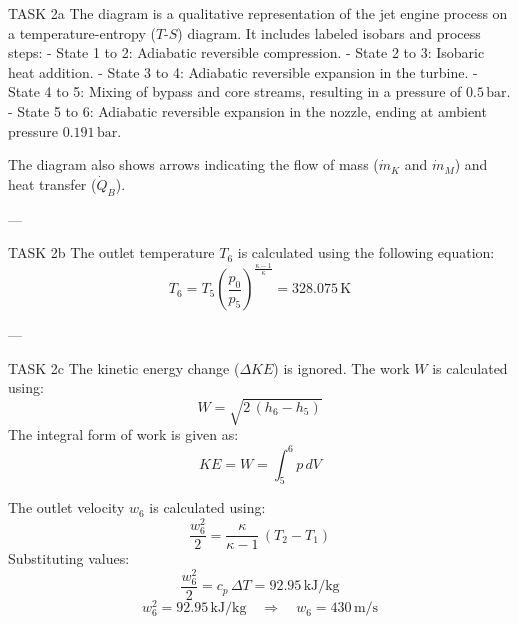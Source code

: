 TASK 2a  
The diagram is a qualitative representation of the jet engine process on a temperature-entropy (\( T \)-\( S \)) diagram. It includes labeled isobars and process steps:  
- State 1 to 2: Adiabatic reversible compression.  
- State 2 to 3: Isobaric heat addition.  
- State 3 to 4: Adiabatic reversible expansion in the turbine.  
- State 4 to 5: Mixing of bypass and core streams, resulting in a pressure of \( 0.5 \, \text{bar} \).  
- State 5 to 6: Adiabatic reversible expansion in the nozzle, ending at ambient pressure \( 0.191 \, \text{bar} \).  

The diagram also shows arrows indicating the flow of mass (\( \dot{m}_K \) and \( \dot{m}_M \)) and heat transfer (\( \dot{Q}_B \)).  

---

TASK 2b  
The outlet temperature \( T_6 \) is calculated using the following equation:  
\[
T_6 = T_5 \left( \frac{p_0}{p_5} \right)^{\frac{\kappa - 1}{\kappa}} = 328.075 \, \text{K}
\]  

---

TASK 2c  
The kinetic energy change (\( \Delta KE \)) is ignored. The work \( W \) is calculated using:  
\[
W = \sqrt{2 \, (h_6 - h_5)}
\]  
The integral form of work is given as:  
\[
KE = W = \int_{5}^{6} p \, dV
\]  

The outlet velocity \( w_6 \) is calculated using:  
\[
\frac{w_6^2}{2} = \frac{\kappa}{\kappa - 1} \, (T_2 - T_1)
\]  
Substituting values:  
\[
\frac{w_6^2}{2} = c_p \, \Delta T = 92.95 \, \text{kJ/kg}
\]  
\[
w_6^2 = 92.95 \, \text{kJ/kg} \quad \Rightarrow \quad w_6 = 430 \, \text{m/s}
\]